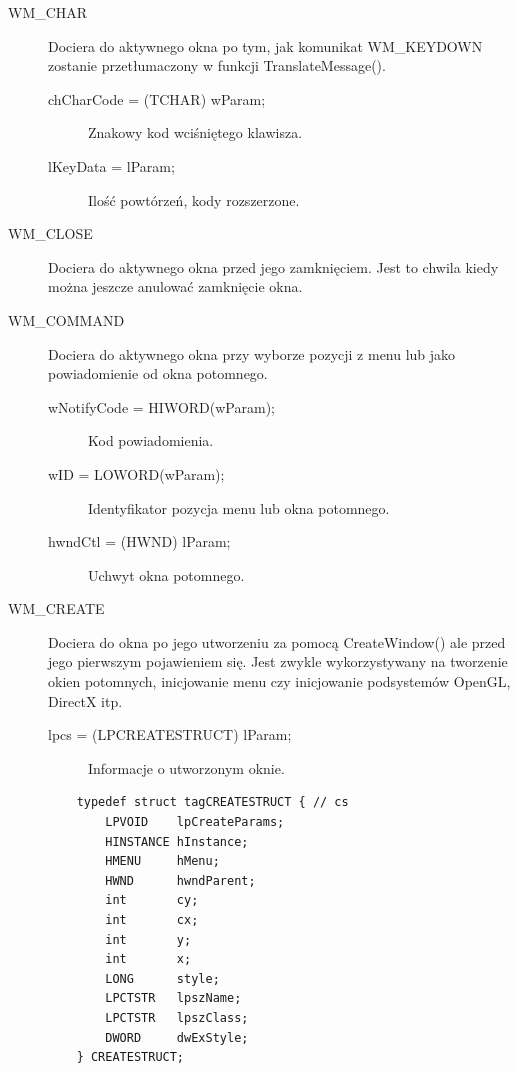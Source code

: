 \begin{description}
\item[WM\_CHAR] Dociera do aktywnego okna po tym, jak komunikat WM\_KEYDOWN zostanie przetłumaczony
	w funkcji TranslateMessage().

        \begin{description}
		\item[chCharCode = (TCHAR) wParam;] Znakowy kod wciśniętego klawisza.
		\item[lKeyData = lParam;] Ilość powtórzeń, kody rozszerzone.
	\end{description}

\item[WM\_CLOSE] Dociera do aktywnego okna przed jego zamknięciem. Jest to chwila kiedy można
	jeszcze anulować zamknięcie okna.

\item[WM\_COMMAND] Dociera do aktywnego okna przy wyborze pozycji z menu lub jako powiadomienie
	od okna potomnego.

        \begin{description}
		\item[wNotifyCode = HIWORD(wParam);] Kod powiadomienia.
		\item[wID = LOWORD(wParam);] Identyfikator pozycja menu lub okna potomnego.
		\item[hwndCtl = (HWND) lParam;] Uchwyt okna potomnego.
	\end{description}

\item[WM\_CREATE] Dociera do okna po jego utworzeniu za pomocą CreateWindow() ale przed jego
        pierwszym pojawieniem się. Jest zwykle wykorzystywany na tworzenie okien potomnych,
	inicjowanie menu czy inicjowanie podsystemów OpenGL, DirectX itp.

        \begin{description}
		\item[lpcs = (LPCREATESTRUCT) lParam;] Informacje o utworzonym oknie.
	\end{description}

	\begin{scriptsize}
	\begin{verbatim}
	typedef struct tagCREATESTRUCT { // cs 
	    LPVOID    lpCreateParams; 
	    HINSTANCE hInstance; 
	    HMENU     hMenu; 
	    HWND      hwndParent; 
	    int       cy; 
	    int       cx; 
	    int       y; 
	    int       x; 
	    LONG      style; 
	    LPCTSTR   lpszName; 
	    LPCTSTR   lpszClass; 
	    DWORD     dwExStyle; 
	} CREATESTRUCT; 
	\end{verbatim}
	\end{scriptsize}


\end{description}
